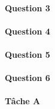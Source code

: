\paragraph{Question 3}
\paragraph{Question 4}
\paragraph{Question 5}
\paragraph{Question 6}
\paragraph{Tâche A}

